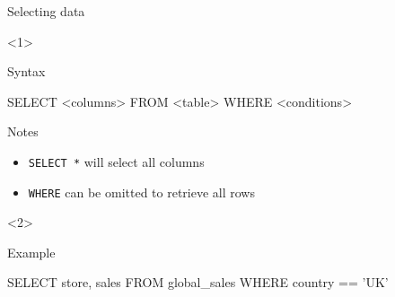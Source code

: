 \begin{frame}[t,fragile]{Selecting data}
    \begin{onlyenv}<1>
        \begin{block}{Syntax}
            \begin{sql}
                SELECT <columns>
                FROM <table>
                WHERE <conditions>
            \end{sql}
        \end{block}
        \vfill
        \begin{block}{Notes}
            \begin{itemize}
                \item \texttt{SELECT *} will select \alert{all columns}
                \item \texttt{WHERE} can be omitted to retrieve
                      \alert{all rows}
            \end{itemize}
        \end{block}
    \end{onlyenv}
    \begin{onlyenv}<2>
        \begin{block}{Example}
            \begin{sql}
                SELECT store, sales
                FROM global_sales
                WHERE country == 'UK'
            \end{sql}
        \end{block}
    \end{onlyenv}
\end{frame}

